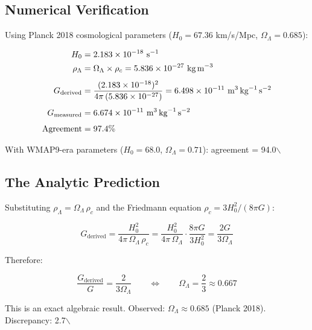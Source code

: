 \documentclass[11pt,letterpaper]{article}
\begin{document}
\subsection{Numerical Verification}
\label{sec:org2c362f1}

Using Planck 2018 cosmological parameters (\(H_0 = 67.36\) km/s/Mpc, \(\Omega_\Lambda = 0.685\)):

\begin{align*}
H_0 &= 2.183 \times 10^{-18}\ \text{s}^{-1}\\
\rho_\Lambda &= \Omega_\Lambda \times \rho_c = 5.836 \times 10^{-27}\ \text{kg\,m}^{-3}\\[4pt]
G_\text{derived} &= \frac{(2.183\times10^{-18})^2}{4\pi\,(5.836\times10^{-27})} = 6.498 \times 10^{-11}\ \text{m}^3\,\text{kg}^{-1}\,\text{s}^{-2}\\[4pt]
G_\text{measured} &= 6.674 \times 10^{-11}\ \text{m}^3\,\text{kg}^{-1}\,\text{s}^{-2}\\[4pt]
\text{Agreement} &= 97.4\%
\end{align*}

With WMAP9-era parameters (\(H_0 = 68.0\), \(\Omega_\Lambda = 0.71\)): agreement = 94.0$\backslash$%

\subsection{The Analytic Prediction}
\label{sec:org9dd34c2}

Substituting \(\rho_\Lambda = \Omega_\Lambda\,\rho_c\) and the Friedmann equation \(\rho_c = 3H_0^2/(8\pi G)\):

\begin{equation}
G_\text{derived} = \frac{H_0^2}{4\pi\,\Omega_\Lambda\,\rho_c} = \frac{H_0^2}{4\pi\,\Omega_\Lambda} \cdot \frac{8\pi G}{3H_0^2} = \frac{2G}{3\Omega_\Lambda}
\end{equation}

Therefore:

\begin{equation}
\frac{G_\text{derived}}{G} = \frac{2}{3\Omega_\Lambda} \qquad \Longleftrightarrow \qquad \boxed{\Omega_\Lambda = \frac{2}{3} \approx 0.667}
\end{equation}

This is an exact algebraic result. Observed: \(\Omega_\Lambda \approx 0.685\) (Planck 2018). Discrepancy: 2.7$\backslash$%
\end{document}

